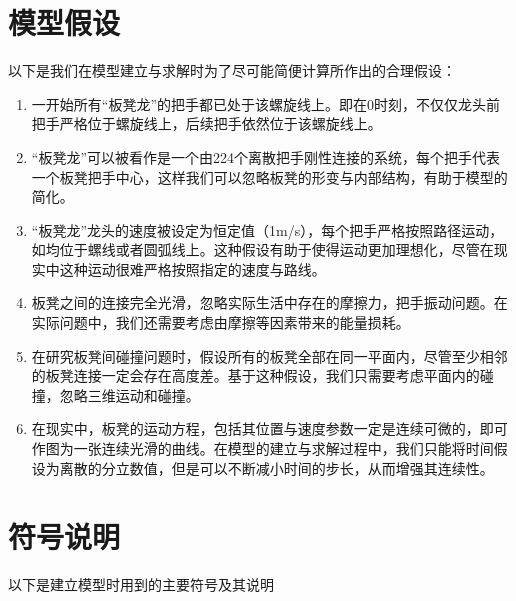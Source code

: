 \documentclass{cumcmthesis1}
\begin{document}
\section{模型假设}
\par
以下是我们在模型建立与求解时为了尽可能简便计算所作出的合理假设：
\begin{enumerate}
    \item 一开始所有“板凳龙”的把手都已处于该螺旋线上。即在0时刻，不仅仅龙头前把手严格位于螺旋线上，后续把手依然位于该螺旋线上。
    \item “板凳龙”可以被看作是一个由224个离散把手刚性连接的系统，每个把手代表一个板凳把手中心，这样我们可以忽略板凳的形变与内部结构，有助于模型的简化。
    \item “板凳龙”龙头的速度被设定为恒定值（1m/s），每个把手严格按照路径运动，如均位于螺线或者圆弧线上。这种假设有助于使得运动更加理想化，尽管在现实中这种运动很难严格按照指定的速度与路线。
    \item 板凳之间的连接完全光滑，忽略实际生活中存在的摩擦力，把手振动问题。在实际问题中，我们还需要考虑由摩擦等因素带来的能量损耗。
    \item 在研究板凳间碰撞问题时，假设所有的板凳全部在同一平面内，尽管至少相邻的板凳连接一定会存在高度差。基于这种假设，我们只需要考虑平面内的碰撞，忽略三维运动和碰撞。
    \item 在现实中，板凳的运动方程，包括其位置与速度参数一定是连续可微的，即可作图为一张连续光滑的曲线。在模型的建立与求解过程中，我们只能将时间假设为离散的分立数值，但是可以不断减小时间的步长，从而增强其连续性。
\end{enumerate}
\newpage
\section{符号说明}
\par 以下是建立模型时用到的主要符号及其说明
\end{document}
